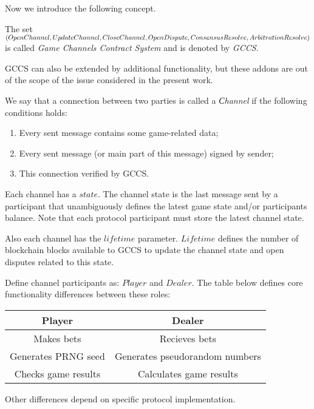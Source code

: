 Now we introduce the following concept. 
\begin{defn}
The set $ (OpenChannel, UpdateChannel, CloseChannel,\\ OpenDispute,  ConsensusResolve, ArbitrationResolve) $
is called \textit {Game Channels Contract System} and is denoted by \textit {GCCS}. 
\end{defn}

\begin{remark}
GCCS can also be extended by additional functionality, but these addons are out of the scope of the issue considered in the present work. 
\end{remark}

\begin{defn}
We say that a connection between two parties is called a \textit {Сhannel} if the following conditions holds:
	\begin{enumerate}
		\item Every sent message contains some game-related data;
		\item Every sent message (or main part of this message) signed by sender;
		\item This connection verified by GCCS. 
	\end{enumerate}
\end{defn}

Each channel has a $state$. The channel state is the last message sent by a participant that unambiguously defines the latest game state and/or participants balance. Note that each protocol participant must store the latest channel state. 

Also each channel has the  $lifetime$ parameter. $Lifetime$ defines the number of blockchain blocks available to GCCS to update the channel state and open disputes related to this state. 

Define channel participants as: $ Player $ and $Dealer$. The table below defines core functionality differences between these roles:
\begin{center}
\begin{tabular}{ |c|c| } 
 \hline
 \textbf{Player} & \textbf{Dealer} \\ 
 \hline
 Makes bets & Recieves bets \\ 
 Generates PRNG seed & Generates pseudorandom numbers \\ 
 Checks game results & Calculates game results\\
 \hline
\end{tabular}
\end{center}
Other differences depend on specific protocol implementation.


